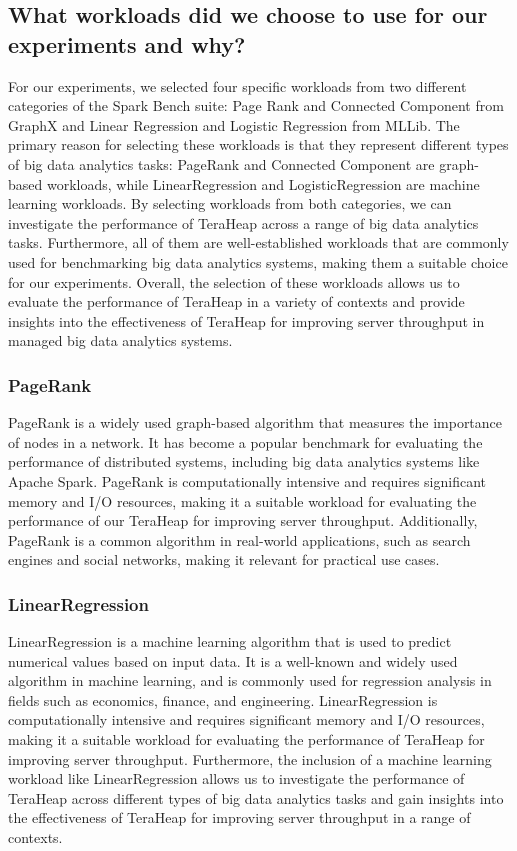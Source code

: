 \subsection{What workloads did we choose to use for our experiments and why?}
For our experiments, we selected four specific workloads from two
different categories of the Spark Bench suite: Page Rank and Connected
Component from GraphX and Linear Regression and Logistic Regression
from MLLib. The primary reason for selecting these workloads is that
they represent different types of big data analytics tasks: PageRank
and Connected Component are graph-based workloads, while
LinearRegression and LogisticRegression are machine learning
workloads. By selecting workloads from both categories, we can
investigate the performance of TeraHeap across a range of
big data analytics tasks. Furthermore, all of them are
well-established workloads that are commonly used for benchmarking big
data analytics systems, making them a suitable choice for our
experiments. Overall, the selection of these workloads allows us to
evaluate the performance of TeraHeap in a variety of contexts and
provide insights into the effectiveness of TeraHeap for improving
server throughput in managed big data analytics systems.

\subsubsection{PageRank}
PageRank is a widely used graph-based algorithm that measures the
importance of nodes in a network. It has become a popular benchmark
for evaluating the performance of distributed systems, including big
data analytics systems like Apache Spark. PageRank is computationally
intensive and requires significant memory and I/O resources, making it
a suitable workload for evaluating the performance of our TeraHeap
for improving server throughput. Additionally, PageRank is a
common algorithm in real-world applications, such as search engines
and social networks, making it relevant for practical use cases.

\subsubsection{LinearRegression}
LinearRegression is a machine learning algorithm that is used to
predict numerical values based on input data. It is a well-known and
widely used algorithm in machine learning, and is commonly used for
regression analysis in fields such as economics, finance, and
engineering. LinearRegression is computationally intensive and
requires significant memory and I/O resources, making it a suitable
workload for evaluating the performance of TeraHeap for
improving server throughput. Furthermore, the inclusion of a machine
learning workload like LinearRegression allows us to investigate the
performance of TeraHeap across different types of big data
analytics tasks and gain insights into the effectiveness of TeraHeap
for improving server throughput in a range of contexts.

